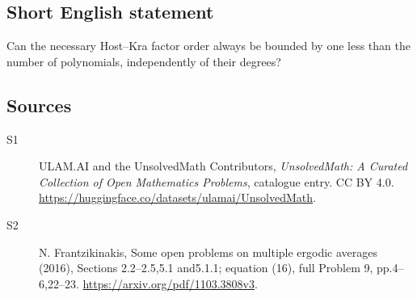 \documentclass[11pt]{article}
\begin{document}
\subsection{Short English statement}
Can the necessary Host--Kra factor order always be bounded by one less than the number of polynomials, independently of their degrees?
\subsection{Sources}
\begin{description}
\item[\hypertarget{source:statement:1}{S1}] ULAM.AI and the UnsolvedMath Contributors, \emph{UnsolvedMath: A Curated Collection of Open Mathematics Problems}, catalogue entry. CC BY 4.0. \url{https://huggingface.co/datasets/ulamai/UnsolvedMath}.
\item[\hypertarget{source:statement:2}{S2}] N. Frantzikinakis, Some open problems on multiple ergodic averages (2016), Sections 2.2--2.5,5.1 and5.1.1; equation (16), full Problem 9, pp.4--6,22--23. \url{https://arxiv.org/pdf/1103.3808v3}.
\end{description}
\label{end:statement}
\end{document}
